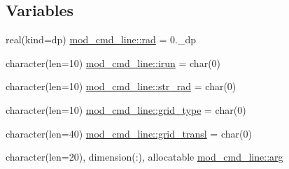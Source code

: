 \subsection*{Variables}
\begin{DoxyCompactItemize}
\item 
real(kind=dp) \hyperlink{namespacemod__cmd__line_a726e623fa552ec6109d7f0e78545afe9}{mod\+\_\+cmd\+\_\+line\+::rad} = 0.\+\_\+dp
\item 
character(len=10) \hyperlink{namespacemod__cmd__line_aae2bce3e1e50220133e7bd310a051881}{mod\+\_\+cmd\+\_\+line\+::irun} = char(0)
\item 
character(len=10) \hyperlink{namespacemod__cmd__line_aa7def1b6cf5f62c8473902ef9fc7f307}{mod\+\_\+cmd\+\_\+line\+::str\+\_\+rad} = char(0)
\item 
character(len=10) \hyperlink{namespacemod__cmd__line_ad92694e0caab203d3bc911dabb059271}{mod\+\_\+cmd\+\_\+line\+::grid\+\_\+type} = char(0)
\item 
character(len=40) \hyperlink{namespacemod__cmd__line_aa1ebd20914c6804b19cef6f2f1f5b8b9}{mod\+\_\+cmd\+\_\+line\+::grid\+\_\+transl} = char(0)
\item 
character(len=20), dimension(\+:), allocatable \hyperlink{namespacemod__cmd__line_a39002195e12526c3d97ff7ee81f9c00c}{mod\+\_\+cmd\+\_\+line\+::arg}
\end{DoxyCompactItemize}
